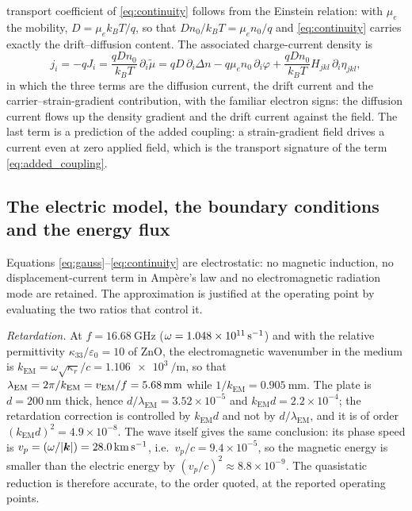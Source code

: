 transport coefficient of \eqref{eq:continuity} follows from the Einstein
relation: with $\mu_e$ the mobility, $D=\mu_ek_BT/q$, so that
$Dn_0/k_BT=\mu_en_0/q$ and \eqref{eq:continuity} carries exactly the
drift--diffusion content.  The associated charge-current density is
\begin{equation}
\label{eq:current}
j_i=-qJ_i=\frac{qDn_0}{k_BT}\,\partial_i\widetilde\mu
=qD\,\partial_i\Delta n-q\mu_e n_0\,\partial_i\varphi
+\frac{qDn_0}{k_BT}H_{jkl}\,\partial_i\eta_{jkl},
\end{equation}
in which the three terms are the diffusion current, the drift current and the
carrier--strain-gradient contribution, with the familiar electron signs: the
diffusion current flows up the density gradient and the drift current against
the field.  The last term is a prediction of the added coupling: a
strain-gradient field drives a current even at zero applied field, which is the
transport signature of the term \eqref{eq:added_coupling}.


\subsection{The electric model, the boundary conditions and the energy flux}
\label{sec:governing_electric}
\label{sec:governing_bc}
\label{sec:governing_energy}

Equations \eqref{eq:gauss}--\eqref{eq:continuity} are electrostatic: no
magnetic induction, no displacement-current term in Amp\`ere's law and no
electromagnetic radiation mode are retained.  The approximation is justified at the operating point by evaluating the two
ratios that control it.

\emph{Retardation.}  At $f=\SI{16.68}{\giga\hertz}$ ($\omega=\SI{1.048e11}{%
\per\second}$) and with the relative permittivity $\kappa_{33}/\varepsilon_0=10$
of ZnO, the electromagnetic wavenumber in the medium is
$k_{\mathrm{EM}}=\omega\sqrt{\kappa_r}/c=\SI{1.106e3}{\per\metre}$, so that
$\lambda_{\mathrm{EM}}=2\pi/k_{\mathrm{EM}}=v_{\mathrm{EM}}/f=\SI{5.68}{%
\milli\metre}$ while $1/k_{\mathrm{EM}}=\SI{0.905}{\milli\metre}$.  The plate is
$d=\SI{200}{\nano\metre}$ thick, hence $d/\lambda_{\mathrm{EM}}=3.52\times10^{-5}$
and $k_{\mathrm{EM}}d=2.2\times10^{-4}$; the retardation correction is
controlled by $k_{\mathrm{EM}}d$ and not by $d/\lambda_{\mathrm{EM}}$, and it is
of order $(k_{\mathrm{EM}}d)^2=4.9\times10^{-8}$.  The wave itself gives the same conclusion: its phase speed is
$v_p=(\omega/|\boldsymbol{k}|)=\SI{28.0}{\kilo\metre\per\second}$, i.e.\
$v_p/c=9.4\times10^{-5}$, so the magnetic energy is smaller than the electric
energy by $(v_p/c)^2\approx8.8\times10^{-9}$.  The quasistatic reduction is therefore accurate, to the order quoted, at the
reported operating points.

